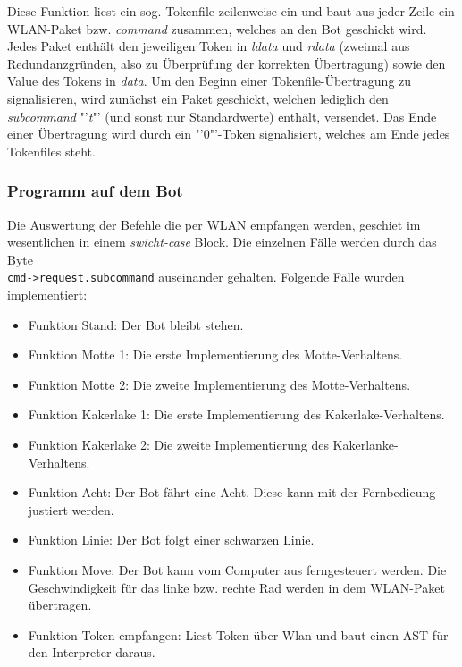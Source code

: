 \begin{itemize}
    Diese Funktion liest ein sog. Tokenfile zeilenweise ein und baut aus jeder Zeile ein WLAN-Paket bzw. \textit{command} zusammen, welches an den Bot geschickt wird. Jedes Paket enthält den jeweiligen Token in \textit{ldata} und \textit{rdata} (zweimal aus Redundanzgründen, also zu Überprüfung der korrekten Übertragung) sowie den Value des Tokens in \textit{data}. Um den Beginn einer Tokenfile-Übertragung zu signalisieren, wird zunächst ein Paket geschickt, welchen lediglich den \textit{subcommand} "'\textit{t}"' (und sonst nur Standardwerte) enthält, versendet. Das Ende einer Übertragung wird durch ein "'0"'-Token signalisiert, welches am Ende jedes Tokenfiles steht.
\end{itemize}


\subsubsection{Programm auf dem Bot}
\label{ctremote_bot}
Die Auswertung der Befehle die per WLAN empfangen werden, geschiet im wesentlichen
in einem \textit{swicht-case} Block. Die einzelnen Fälle werden durch das Byte \\
\verb+cmd->request.subcommand+ auseinander gehalten. Folgende Fälle wurden
implementiert:
\begin{itemize}
    \item Funktion Stand: Der Bot bleibt stehen.
    \item Funktion Motte 1: Die erste Implementierung des Motte-Verhaltens.
    \item Funktion Motte 2: Die zweite Implementierung des Motte-Verhaltens. 
    \item Funktion Kakerlake 1: Die erste Implementierung des Kakerlake-Verhaltens.
    \item Funktion Kakerlake 2: Die zweite Implementierung des Kakerlanke-Verhaltens.
    \item Funktion Acht: Der Bot fährt eine Acht. Diese kann mit der Fernbedieung justiert werden.
    \item Funktion Linie: Der Bot folgt einer schwarzen Linie.
    \item Funktion Move: Der Bot kann vom Computer aus ferngesteuert werden.
        Die Geschwindigkeit für das linke bzw. rechte Rad werden in dem WLAN-Paket übertragen.
    \item Funktion Token empfangen: Liest Token über Wlan und baut einen AST für den Interpreter daraus.
\end{itemize}


